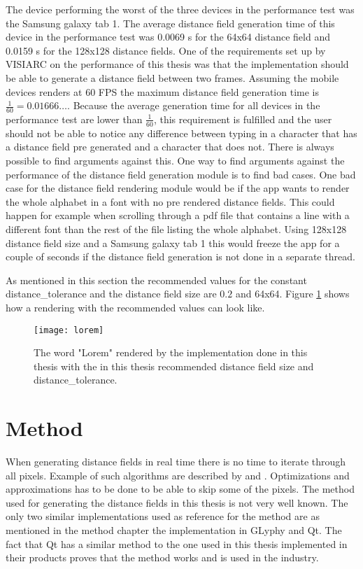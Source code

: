 The device performing the worst of the three devices in the performance test was the Samsung galaxy tab 1. The average distance field generation time of this device in the performance test was 0.0069 s for the 64x64 distance field and 0.0159 s for the 128x128 distance fields. One of the requirements set up by VISIARC on the performance of this thesis was that the implementation should be able to generate a distance field between two frames. Assuming the mobile devices renders at 60 FPS the maximum distance field generation time is $\frac{1}{60}=0.01666\dots$. Because the average generation time for all devices in the performance test are lower than $\frac{1}{60}$, this requirement is fulfilled and the user should not be able to notice any difference between typing in a character that has a distance field pre generated and a character that does not. There is always possible to find arguments against this. One way to find arguments against the performance of the distance field generation module is to find bad cases. One bad case for the distance field rendering module would be if the app wants to render the whole alphabet in a font with no pre rendered distance fields. This could happen for example when scrolling through a pdf file that contains a line with a different font than the rest of the file listing the whole alphabet. Using 128x128 distance field size and a Samsung galaxy tab 1 this would freeze the app for a couple of seconds if the distance field generation is not done in a separate thread.

As mentioned in this section the recommended values for the constant distance\_tolerance and the distance field size are $0.2$ and 64x64. Figure \ref{fig:recommendation} shows how a rendering with the recommended values can look like.

\begin{figure}[H]
\texttt{[image: lorem]}
\caption{The word "Lorem" rendered by the implementation done in this thesis with the in this thesis recommended distance field size and distance\_tolerance.}
\label{fig:recommendation}
\end{figure}


\section{Method}
When generating distance fields in real time there is no time to iterate through all pixels. Example of such algorithms are described by \citet{meijster} and \citet{Danielsson}. Optimizations and approximations has to be done to be able to skip some of the pixels. The method used for generating the distance fields in this thesis is not very well known. The only two similar implementations used as reference for the method are as mentioned in the method chapter the implementation in GLyphy and Qt. The fact that Qt has a similar method to the one used in this thesis implemented in their products proves that the method works and is used in the industry. 

